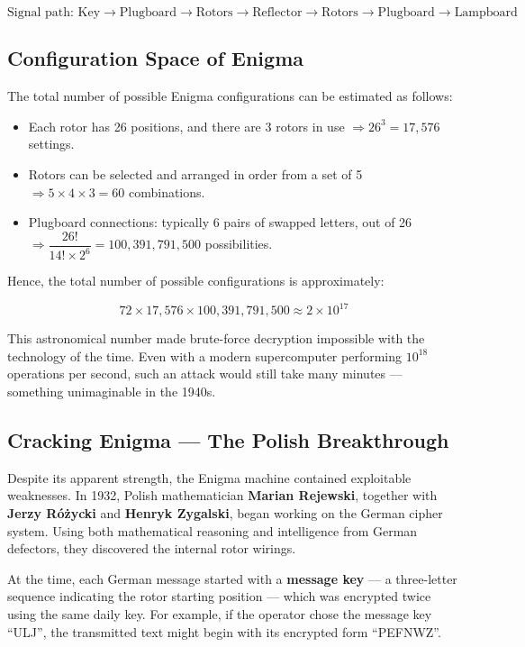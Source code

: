 \[
\text{Signal path: } \text{Key} \rightarrow \text{Plugboard} \rightarrow \text{Rotors} \rightarrow \text{Reflector} \rightarrow \text{Rotors} \rightarrow \text{Plugboard} \rightarrow \text{Lampboard}
\]

\subsection{Configuration Space of Enigma}

The total number of possible Enigma configurations can be estimated as follows:

\begin{itemize}
  \item Each rotor has 26 positions, and there are 3 rotors in use $\Rightarrow 26^3 = 17,576$ settings.
  \item Rotors can be selected and arranged in order from a set of 5 $\Rightarrow 5 \times 4 \times 3 = 60$ combinations.
  \item Plugboard connections: typically 6 pairs of swapped letters, out of 26 $\Rightarrow \dfrac{26!}{14! \times 2^6} = 100{,}391{,}791{,}500$ possibilities.
\end{itemize}

Hence, the total number of possible configurations is approximately:

\[
72 \times 17{,}576 \times 100{,}391{,}791{,}500 \approx 2 \times 10^{17}
\]

This astronomical number made brute-force decryption impossible with the technology of the time.  
Even with a modern supercomputer performing $10^{18}$ operations per second, such an attack would still take many minutes — something unimaginable in the 1940s.

\subsection{Cracking Enigma — The Polish Breakthrough}

Despite its apparent strength, the Enigma machine contained exploitable weaknesses.  
In 1932, Polish mathematician \textbf{Marian Rejewski}, together with \textbf{Jerzy Różycki} and \textbf{Henryk Zygalski}, began working on the German cipher system.  
Using both mathematical reasoning and intelligence from German defectors, they discovered the internal rotor wirings.

At the time, each German message started with a \textbf{message key} — a three-letter sequence indicating the rotor starting position — which was encrypted twice using the same daily key.  
For example, if the operator chose the message key “ULJ”, the transmitted text might begin with its encrypted form “PEFNWZ”.

